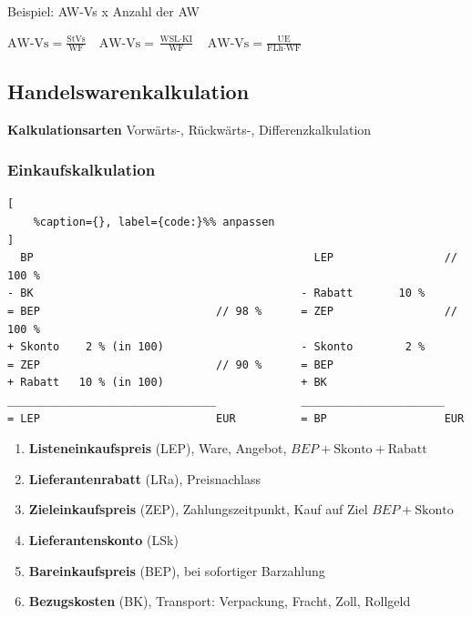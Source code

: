 Beispiel: AW-Vs x Anzahl der AW

$\boxed{\text{AW-Vs} = \frac{\text{StVs}}{\text{WF}}} \quad \boxed{\text{AW-Vs} = \frac{\text{WSL} \cdot \text{KI}}{\text{WF}}} \quad \boxed{\text{AW-Vs} = \frac{\text{UE}}{\text{FLh} \cdot \text{WF}}}$

\newpage

\subsection{Handelswarenkalkulation}\label{handelswarenkalkulation}

\textbf{Kalkulationsarten} Vorwärts-, Rückwärts-, Differenzkalkulation

\subsubsection{Einkaufskalkulation}\label{einkaufskalkulation}

\lstset{language=Python}%
\begin{lstlisting}[
	%caption={}, label={code:}%% anpassen
]
  BP                                           LEP                 // 100 %
- BK                                         - Rabatt       10 %                 
= BEP                           // 98 %      = ZEP                 // 100 % 
+ Skonto    2 % (in 100)                     - Skonto        2 %
= ZEP                           // 90 %      = BEP                 
+ Rabatt   10 % (in 100)                     + BK
________________________________             ______________________         
= LEP                           EUR          = BP                  EUR 
\end{lstlisting}

\begin{enumerate}
\item
  \textbf{Listeneinkaufspreis} (LEP), Ware, Angebot,
  $\boxed{BEP + \text{Skonto} + \text{Rabatt}}$
\item
  \textbf{Lieferantenrabatt} (LRa), Preisnachlass
\item
  \textbf{Zieleinkaufspreis} (ZEP), Zahlungszeitpunkt, Kauf auf Ziel
  $\boxed{BEP + \text{Skonto}}$
\item
  \textbf{Lieferantenskonto} (LSk)
\item
  \textbf{Bareinkaufspreis} (BEP), bei sofortiger Barzahlung
\item
  \textbf{Bezugskosten} (BK), Transport: Verpackung, Fracht, Zoll,
  Rollgeld
\end{enumerate}

